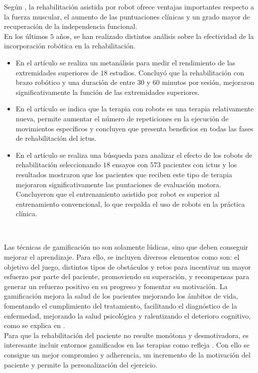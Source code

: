 Según \cite{perales3d}, la rehabilitación asistida por robot ofrece ventajas importantes respecto a la fuerza muscular, el aumento de las puntuaciones clínicas y un grado mayor de recuperación de la independencia funcional.\\

En los últimos $5$ años, se han realizado distintos análisis sobre la efectividad de la incorporación robótica en la rehabilitación.

\begin{itemize}
	\item En el artículo \cite{perales4a} se realiza un metanálisis para medir el rendimiento de las extremidades superiores de $18$ estudios. Concluyó que la rehabilitación con brazo robótico y una duración de entre $30$ y $60$ minutos por sesión, mejoraron significativamente la función de las extremidades superiores.
	\item En el artículo \cite{perales4b} se indica que la terapia con robots es una terapia relativamente nueva, permite aumentar el número de repeticiones en la ejecución de movimientos específicos y concluyen que presenta beneficios en todas las fases de rehabilitación del ictus.
	\item En el artículo \cite{perales4c} se realiza una búsqueda para analizar el efecto de los robots de rehabilitación seleccionando $18$ ensayos con $573$ pacientes con ictus y los resultados mostraron que los pacientes que reciben este tipo de terapia mejoraron significativamente las puntaciones de evaluación motora. Concluyeron que el entrenamiento asistido por robot es superior al entrenamiento convencional, lo que respalda el uso de robots en la práctica clínica.
\end{itemize}\

Las técnicas de gamificación no son solamente lúdicas, sino que deben conseguir mejorar el aprendizaje.
Para ello, se incluyen diversos elementos como son: el objetivo del juego, distintos tipos de obstáculos y retos para incentivar un mayor esfuerzo por parte del paciente, promoviendo su superación, y recompensas para generar un refuerzo positivo en su progreso y fomentar su motivación.
La gamificación mejora la salud de los pacientes mejorando los ámbitos de vida, fomentando el cumplimiento del tratamiento, facilitando el diagnóstico de la enfermedad, mejorando la salud psicológica y ralentizando el deterioro cognitivo, como se explica en \cite{cita6}.\\

Para que la rehabilitación del paciente no resulte monótona y desmotivadora, es interesante incluir entornos gamificados en las terapias como refleja \cite{perales5a}.
Con ello se consigue un mejor compromiso y adherencia, un incremento de la motivación del paciente y permite la personalización del ejercicio.\\


